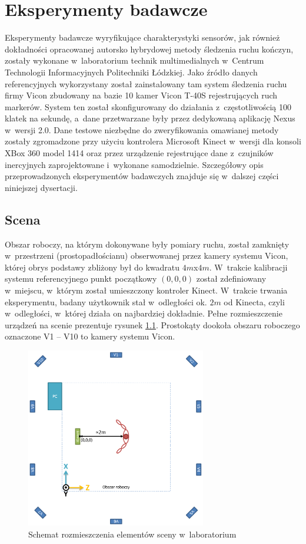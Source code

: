 \chapter{Eksperymenty badawcze}\label{chap:experiments}
Eksperymenty badawcze wyryfikujące charakterystyki sensorów, jak również dokładności opracowanej autorsko hybrydowej metody śledzenia ruchu kończyn, zostały wykonane w~laboratorium technik multimedialnych w~Centrum Technologii Informacyjnych Politechniki Łódzkiej. Jako źródło danych referencyjnych wykorzystany został zainstalowany tam system śledzenia ruchu firmy Vicon zbudowany na bazie 10 kamer Vicon T-40S \cite{ViconSpec} rejestrujących ruch markerów. System ten został skonfigurowany do działania z~częstotliwością 100 klatek na sekundę, a~dane przetwarzane były przez dedykowaną aplikację Nexus w~wersji 2.0. Dane testowe niezbędne do zweryfikowania omawianej metody zostały zgromadzone przy użyciu kontrolera Microsoft Kinect w~wersji dla konsoli XBox 360 model 1414 oraz przez urządzenie rejestrujące dane z~czujników inercyjnych zaprojektowane i~wykonane samodzielnie. Szczegółowy opis przeprowadzonych eksperymentów badawczych znajduje się w~dalszej części niniejszej dysertacji.

\section{Scena}
Obszar roboczy, na którym dokonywane były pomiary ruchu, został zamknięty w~przestrzeni (prostopadłościanu) obserwowanej przez kamery systemu Vicon, której obrys podstawy zbliżony był do kwadratu $4m$x$4m$. W~trakcie kalibracji systemu referencyjnego punkt początkowy $\left(0, 0, 0\right)$ został zdefiniowany w~miejscu, w~którym został umieszczony kontroler Kinect. W~trakcie trwania eksperymentu, badany użytkownik stał w~odległości ok. $2m$ od Kinecta, czyli w~odległości, w~której działa on najbardziej dokładnie.  Pełne rozmieszczenie urządzeń na scenie prezentuje rysunek \ref{fig:experiments:scene}. Prostokąty dookoła obszaru roboczego oznaczone V1 -- V10 to kamery systemu Vicon.

\begin{figure}[!htp]
	\centering
	\includegraphics[width=0.7\textwidth]{images/scene.png}
	\caption{Schemat rozmieszczenia elementów sceny w~laboratorium}
	\label{fig:experiments:scene}
\end{figure}
  
